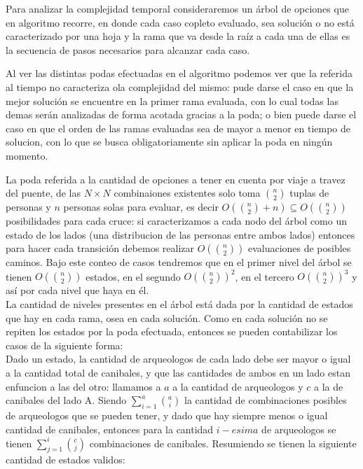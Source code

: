 
Para analizar la complejidad temporal consideraremos un árbol de opciones que en algoritmo recorre, en donde cada caso copleto evaluado, sea solución o no está caracterizado por una hoja y la rama que va desde la raíz a cada una de ellas es la secuencia de pasos necesarios para alcanzar cada caso.

Al ver las distintas podas efectuadas en el algoritmo podemos ver que la referida al tiempo no caracteriza ola complejidad del mismo: pude darse el caso en que la mejor solución se encuentre en la primer rama evaluada, con lo cual todas las demas serán analizadas de forma acotada gracias a la poda; o bien puede darse el caso en que el orden de las ramas evaluadas sea de mayor a menor en tiempo de solucion, con lo que se busca obligatoriamente sin aplicar la poda en ningún momento.

La poda referida a la cantidad de opciones a tener en cuenta por viaje a travez del puente, de las $N \times N$ combinaiones existentes solo toma $\binom {n}{2}$ tuplas de personas y $n$ personas solas para evaluar, es decir $O(\binom {n}{2} + n) \subseteq O(\binom {n}{2})$ posibilidades para cada cruce: si caracterizamos a cada nodo del árbol como un estado de los lados (una distribucion de las personas entre ambos lados) entonces para hacer cada transición debemos realizar $O(\binom {n}{2})$ evaluaciones de posibles caminos. Bajo este conteo de casos tendremos que en el primer nivel del árbol se tienen $O(\binom {n}{2})$ estados, en el segundo $O(\binom {n}{2})^2$, en el tercero $O(\binom {n}{2})^3$ y así por cada nivel que haya en él.\\

La cantidad de niveles presentes en el árbol está dada por la cantidad de estados que hay en cada rama, osea en cada solución. Como en cada solución no se repiten los estados por la poda efectuada, entonces se pueden contabilizar los casos de la siguiente forma:\\

Dado un estado, la cantidad de arqueologos de cada lado debe ser mayor o igual a la cantidad total de canibales, y que las cantidades de ambos en un lado estan enfuncion a las del otro: llamamos a  $a$ a la cantidad de arqueologos y $c$ a la de canibales del lado A. Siendo $\sum_{i=1}^{a}\binom {a}{i}$ la cantidad de combinaciones posibles de arqueologos que se pueden tener, y dado que hay siempre menos o igual cantidad de canibales, entonces para la cantidad  $i-esima$ de arqueologos se tienen $\sum_{j=1}^{i}\binom {c}{j}$ combinaciones de canibales. Resumiendo se tienen la siguiente cantidad de estados validos:


